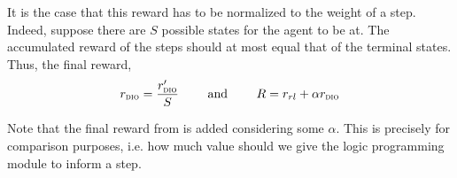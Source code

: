 It is the case that this reward has to be normalized to the weight of a step. Indeed, suppose there are $S$ possible states for the agent to be at. 
The accumulated reward of the steps should at most equal that of the terminal states. Thus, the final reward, 
\[
  r_{\textsc{dio}{}} = \dfrac{r'_{\textsc{dio}{}}}{S} \qquad \text{ and } \qquad
  R = r_{rl} + \alpha r_{\textsc{dio}{}}
\]

Note that the final reward from \dio{} is added considering some $\alpha$. This is precisely for comparison purposes, i.e. how much value should we give the logic programming module 
to inform a step. 

